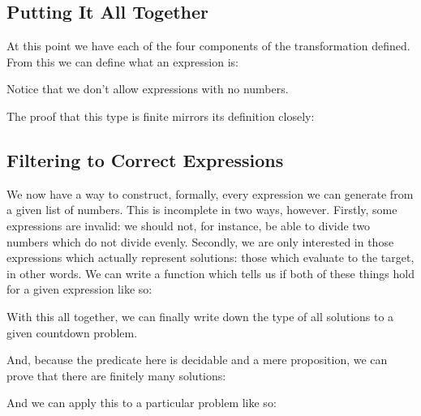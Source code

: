 \subsection{Putting It All Together}
At this point we have each of the four components of the transformation defined.
From this we can define what an expression is:
\begin{agdalisting*}
\end{agdalisting*}
Notice that we don't allow expressions with no numbers.

The proof that this type is finite mirrors its definition closely:
\begin{agdalisting*}
\end{agdalisting*}
\subsection{Filtering to Correct Expressions}
We now have a way to construct, formally, every expression we can generate from
a given list of numbers.
This is incomplete in two ways, however.
Firstly, some expressions are invalid: we should not, for instance, be able to
divide two numbers which do not divide evenly.
Secondly, we are only interested in those expressions which actually represent
solutions: those which evaluate to the target, in other words.
We can write a function which tells us if both of these things hold for a given
expression like so:

\begin{minipage}{\linewidth}
  \begin{multicols}{2}
    \begin{agdalisting*}
    \end{agdalisting*} \columnbreak
    \begin{agdalisting*}
    \end{agdalisting*}
  \end{multicols} \vspace{\baselineskip}
\end{minipage}

With this all together, we can finally write down the type of all solutions to a
given countdown problem.
\begin{agdalisting*}
\end{agdalisting*}
And, because the predicate here is decidable and a mere proposition, we can
prove that there are finitely many solutions:
\begin{agdalisting*}
\end{agdalisting*}
And we can apply this to a particular problem like so:
\begin{agdalisting*}
\end{agdalisting*}

